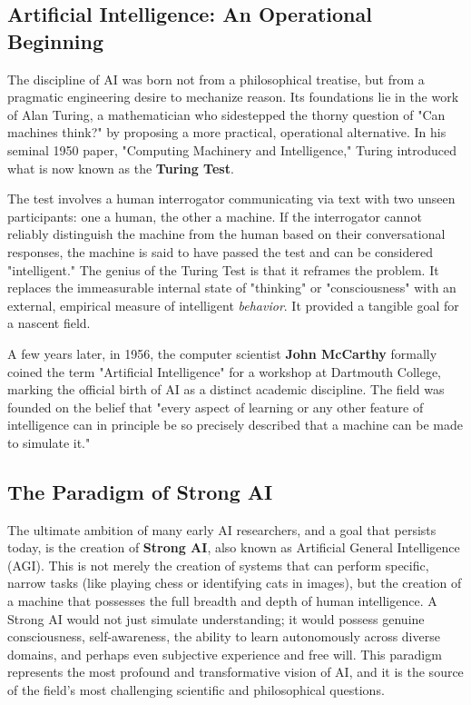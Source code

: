 \subsection*{Artificial Intelligence: An Operational Beginning}
The discipline of AI was born not from a philosophical treatise, but from a pragmatic engineering desire to mechanize reason. Its foundations lie in the work of Alan Turing, a mathematician who sidestepped the thorny question of "Can machines think?" by proposing a more practical, operational alternative. In his seminal 1950 paper, "Computing Machinery and Intelligence," Turing introduced what is now known as the \textbf{Turing Test}.

The test involves a human interrogator communicating via text with two unseen participants: one a human, the other a machine. If the interrogator cannot reliably distinguish the machine from the human based on their conversational responses, the machine is said to have passed the test and can be considered "intelligent." The genius of the Turing Test is that it reframes the problem. It replaces the immeasurable internal state of "thinking" or "consciousness" with an external, empirical measure of intelligent \textit{behavior}. It provided a tangible goal for a nascent field.

A few years later, in 1956, the computer scientist \textbf{John McCarthy} formally coined the term "Artificial Intelligence" for a workshop at Dartmouth College, marking the official birth of AI as a distinct academic discipline. The field was founded on the belief that "every aspect of learning or any other feature of intelligence can in principle be so precisely described that a machine can be made to simulate it."

\subsection*{The Paradigm of Strong AI}
The ultimate ambition of many early AI researchers, and a goal that persists today, is the creation of \textbf{Strong AI}, also known as Artificial General Intelligence (AGI). This is not merely the creation of systems that can perform specific, narrow tasks (like playing chess or identifying cats in images), but the creation of a machine that possesses the full breadth and depth of human intelligence. A Strong AI would not just simulate understanding; it would possess genuine consciousness, self-awareness, the ability to learn autonomously across diverse domains, and perhaps even subjective experience and free will. This paradigm represents the most profound and transformative vision of AI, and it is the source of the field's most challenging scientific and philosophical questions.

